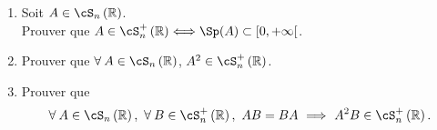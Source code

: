 \begin{enumerate}
\item
Soit $A\in \cS_n\left( \mathbb{R}\right)$.\\
Prouver que $A\in \cS_n^+\left( \mathbb{R}\right)\Longleftrightarrow \Sp(A)\subset \left[0,+\infty \right[$.
	\:\:\:\:
\item
Prouver que $\forall\:A\in \cS_n\left( \mathbb{R}\right)$, $A^2\in \cS_n^+\left( \mathbb{R}\right)$.
	\:\:\:\:
\item

Prouver que $$\forall\:A\in \cS_n\left( \mathbb{R}\right),\ \forall\:B\in \cS_n^+\left( \mathbb{R}\right),\ AB=BA\ \Longrightarrow\ A^2B\in \cS_n^+\left( \mathbb{R}\right).$$
\end{enumerate}
